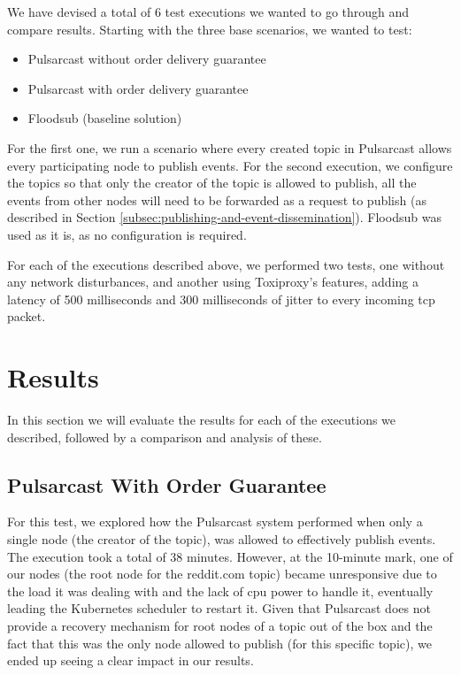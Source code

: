 We have devised a total of 6 test executions we wanted to go through and
compare results. Starting with the three base scenarios, we wanted to test:

\begin{itemize}
  \item Pulsarcast without order delivery guarantee
  \item Pulsarcast with order delivery guarantee
  \item Floodsub (baseline solution)
\end{itemize}

For the first one, we run a scenario where every created topic in Pulsarcast
allows every participating node to publish events. For the second execution, we
configure the topics so that only the creator of the topic is allowed to
publish, all the events from other nodes will need to be forwarded as a request
to publish (as described in Section
\ref{subsec:publishing-and-event-dissemination}).  Floodsub was used as it is,
as no configuration is required. 

For each of the executions described above, we performed two tests, one without
any network disturbances, and another using Toxiproxy's features, adding a
latency of 500 milliseconds and 300 milliseconds of jitter to every incoming
\acrshort{tcp} packet. 

\section{Results}\label{results}

In this section we will evaluate the results for each of the executions we
described, followed by a comparison and analysis of these.

\subsection{Pulsarcast With Order Guarantee}\label{subsec:pulsarcast-with-order-guarantee}

For this test, we explored how the Pulsarcast system performed when only a
single node (the creator of the topic), was allowed to effectively publish
events. The execution took a total of 38 minutes. However, at the 10-minute
mark, one of our nodes (the root node for the reddit.com topic) became
unresponsive due to the load it was dealing with and the lack of \acrshort{cpu} power to
handle it, eventually leading the Kubernetes scheduler to restart it.  Given
that Pulsarcast does not provide a recovery mechanism for root nodes of a topic
out of the box and the fact that this was the only node allowed to publish (for
this specific topic), we ended up seeing a clear impact in our results.

